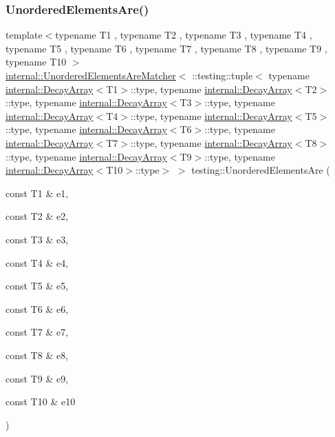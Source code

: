 \subsubsection{\texorpdfstring{Unordered\+Elements\+Are()}{UnorderedElementsAre()}\hspace{0.1cm}{\footnotesize\ttfamily [11/11]}}
{\footnotesize\ttfamily template$<$typename T1 , typename T2 , typename T3 , typename T4 , typename T5 , typename T6 , typename T7 , typename T8 , typename T9 , typename T10 $>$ \\
\hyperlink{classtesting_1_1internal_1_1_unordered_elements_are_matcher}{internal\+::\+Unordered\+Elements\+Are\+Matcher}$<$ \+::testing\+::tuple$<$ typename \hyperlink{structtesting_1_1internal_1_1_decay_array}{internal\+::\+Decay\+Array}$<$T1$>$\+::type, typename \hyperlink{structtesting_1_1internal_1_1_decay_array}{internal\+::\+Decay\+Array}$<$T2$>$\+::type, typename \hyperlink{structtesting_1_1internal_1_1_decay_array}{internal\+::\+Decay\+Array}$<$T3$>$\+::type, typename \hyperlink{structtesting_1_1internal_1_1_decay_array}{internal\+::\+Decay\+Array}$<$T4$>$\+::type, typename \hyperlink{structtesting_1_1internal_1_1_decay_array}{internal\+::\+Decay\+Array}$<$T5$>$\+::type, typename \hyperlink{structtesting_1_1internal_1_1_decay_array}{internal\+::\+Decay\+Array}$<$T6$>$\+::type, typename \hyperlink{structtesting_1_1internal_1_1_decay_array}{internal\+::\+Decay\+Array}$<$T7$>$\+::type, typename \hyperlink{structtesting_1_1internal_1_1_decay_array}{internal\+::\+Decay\+Array}$<$T8$>$\+::type, typename \hyperlink{structtesting_1_1internal_1_1_decay_array}{internal\+::\+Decay\+Array}$<$T9$>$\+::type, typename \hyperlink{structtesting_1_1internal_1_1_decay_array}{internal\+::\+Decay\+Array}$<$T10$>$\+::type$>$ $>$ testing\+::\+Unordered\+Elements\+Are (\begin{DoxyParamCaption}\item[{const T1 \&}]{e1,  }\item[{const T2 \&}]{e2,  }\item[{const T3 \&}]{e3,  }\item[{const T4 \&}]{e4,  }\item[{const T5 \&}]{e5,  }\item[{const T6 \&}]{e6,  }\item[{const T7 \&}]{e7,  }\item[{const T8 \&}]{e8,  }\item[{const T9 \&}]{e9,  }\item[{const T10 \&}]{e10 }\end{DoxyParamCaption})\hspace{0.3cm}{\ttfamily [inline]}}

